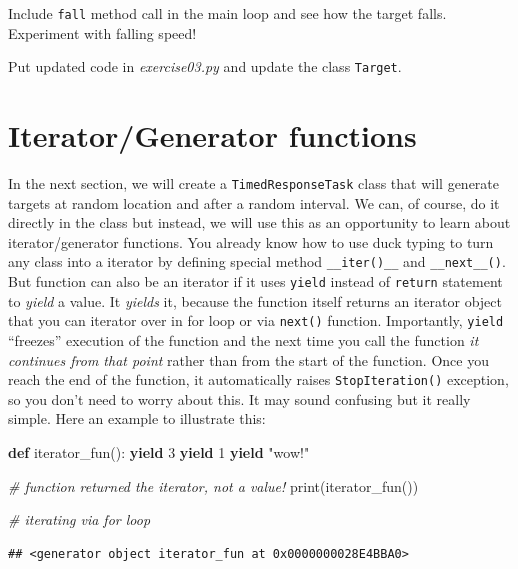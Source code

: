 \documentclass[
]{book}
\newenvironment{Shaded}{\begin{snugshade}}{\end{snugshade}}
\newcommand{\BuiltInTok}[1]{#1}
\newcommand{\CommentTok}[1]{\textcolor[rgb]{0.56,0.35,0.01}{\textit{#1}}}
\newcommand{\ControlFlowTok}[1]{\textcolor[rgb]{0.13,0.29,0.53}{\textbf{#1}}}
\newcommand{\DecValTok}[1]{\textcolor[rgb]{0.00,0.00,0.81}{#1}}
\newcommand{\KeywordTok}[1]{\textcolor[rgb]{0.13,0.29,0.53}{\textbf{#1}}}
\newcommand{\NormalTok}[1]{#1}
\newcommand{\StringTok}[1]{\textcolor[rgb]{0.31,0.60,0.02}{#1}}
\begin{document}
Include \texttt{fall} method call in the main loop and see how the target falls. Experiment with falling speed!

Put updated code in \emph{exercise03.py} and update the class \texttt{Target}.

\hypertarget{iteratorgenerator-functions}{%
\section{Iterator/Generator functions}\label{iteratorgenerator-functions}}

In the next section, we will create a \texttt{TimedResponseTask} class that will generate targets at random location and after a random interval. We can, of course, do it directly in the class but instead, we will use this as an opportunity to learn about iterator/generator functions. You already know how to use duck typing to turn any class into a iterator by defining special method \texttt{\_\_iter()\_\_} and \texttt{\_\_next\_\_()}. But function can also be an iterator if it uses \texttt{yield} instead of \texttt{return} statement to \emph{yield} a value. It \emph{yields} it, because the function itself returns an iterator object that you can iterator over in for loop or via \texttt{next()} function. Importantly, \texttt{yield} ``freezes'' execution of the function and the next time you call the function \emph{it continues from that point} rather than from the start of the function. Once you reach the end of the function, it automatically raises \texttt{StopIteration()} exception, so you don't need to worry about this. It may sound confusing but it really simple. Here an example to illustrate this:

\begin{Shaded}
\begin{Highlighting}[]
\KeywordTok{def}\NormalTok{ iterator\_fun():}
    \ControlFlowTok{yield} \DecValTok{3}
    \ControlFlowTok{yield} \DecValTok{1}
    \ControlFlowTok{yield} \StringTok{"wow!"}
  
\CommentTok{\# function returned the iterator, not a value!}
\BuiltInTok{print}\NormalTok{(iterator\_fun())}

\CommentTok{\# iterating via for loop}
\end{Highlighting}
\end{Shaded}

\begin{verbatim}
## <generator object iterator_fun at 0x0000000028E4BBA0>
\end{verbatim}
\end{document}
